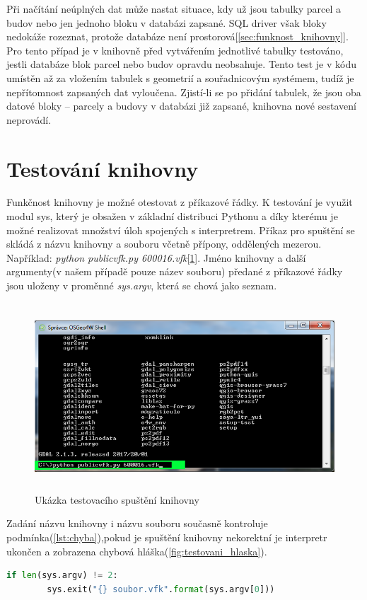 Při načítání neúplných dat  může nastat situace, kdy už jsou tabulky parcel a budov nebo jen jednoho bloku v databázi zapsané. SQL driver však bloky nedokáže rozeznat, protože databáze není prostorová[\ref{sec:funknost_knihovny}]. Pro tento případ je v knihovně před vytvářením jednotlivé tabulky testováno, jestli databáze blok parcel nebo budov opravdu neobsahuje. Tento test je v kódu umístěn až za vložením tabulek s geometrií a souřadnicovým systémem, tudíž je nepřítomnost zapsaných dat vyloučena. Zjistí-li se po přidání tabulek, že jsou oba datové bloky -- parcely a budovy v databázi již zapsané, knihovna nové sestavení neprovádí. 
\section{Testování knihovny}
Funkčnost knihovny je možné otestovat z příkazové řádky. K testování je využit modul sys, který je obsažen v základní distribuci Pythonu a díky kterému je možné realizovat množství úloh spojených s interpretrem. Příkaz pro spuštění se skládá z názvu knihovny a  souboru včetně přípony, oddělených mezerou. Například: \textit{python publicvfk.py 600016.vfk}[\ref{fig:testovani_ukazka}]. Jméno knihovny a další argumenty(v našem případě pouze název  souboru) předané z příkazové řádky jsou uloženy v proměnné \textit{sys.argv}, která se chová jako seznam.

\begin{figure}[H]
	 \centering
      \includegraphics[height=7cm]{./pictures/testovani_ukazka.png}
      \caption{Ukázka testovacího spuštění knihovny}
      \label{fig:testovani_ukazka}
  \end{figure}

Zadání názvu knihovny i názvu  souboru současně kontroluje podmínka(\ref{lst:chyba}),pokud je spuštění knihovny nekorektní je interpretr ukončen a zobrazena chybová hláška(\ref{fig:testovani_hlaska}).
\begin{lstlisting}[caption=Podmínka pro spouštěcí příkaz, language=Python, label=lst:chyba, numbers=none]
    if len(sys.argv) != 2:
        sys.exit("{} soubor.vfk".format(sys.argv[0]))
\end{lstlisting}

